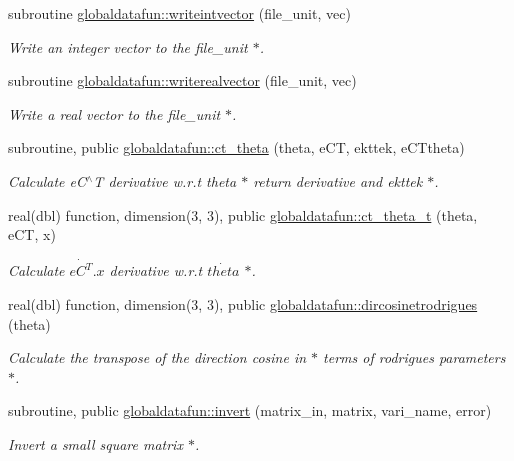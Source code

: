 \begin{DoxyCompactItemize}
subroutine \hyperlink{namespaceglobaldatafun_a08c5dd4cdc68f1694d0d44f76c4df0d5}{globaldatafun\+::writeintvector} (file\+\_\+unit, vec)
\begin{DoxyCompactList}\small\item\em Write an integer vector to the file\+\_\+unit $\ast$. \end{DoxyCompactList}\item 
subroutine \hyperlink{namespaceglobaldatafun_a6a36231350f9af76a3a20cd590f6e40a}{globaldatafun\+::writerealvector} (file\+\_\+unit, vec)
\begin{DoxyCompactList}\small\item\em Write a real vector to the file\+\_\+unit $\ast$. \end{DoxyCompactList}\item 
subroutine, public \hyperlink{namespaceglobaldatafun_a166b3774feeda05d1e3d1761c1412e85}{globaldatafun\+::ct\+\_\+theta} (theta, e\+CT, ekttek, e\+C\+Ttheta)
\begin{DoxyCompactList}\small\item\em Calculate e\+C$^\wedge$T derivative w.\+r.\+t theta $\ast$ return derivative and ekttek $\ast$. \end{DoxyCompactList}\item 
real(dbl) function, dimension(3, 3), public \hyperlink{namespaceglobaldatafun_a88e61f954347d95bbbbeb6b4aa6f2e8f}{globaldatafun\+::ct\+\_\+theta\+\_\+t} (theta, e\+CT, x)
\begin{DoxyCompactList}\small\item\em Calculate $ \dot{eC^T}.x $ derivative w.\+r.\+t $ \dot{theta} $ $\ast$. \end{DoxyCompactList}\item 
real(dbl) function, dimension(3, 3), public \hyperlink{namespaceglobaldatafun_a79e0439ba9c19e8c9bd28d76417cc4db}{globaldatafun\+::dircosinetrodrigues} (theta)
\begin{DoxyCompactList}\small\item\em Calculate the transpose of the direction cosine in $\ast$ terms of rodrigues parameters $\ast$. \end{DoxyCompactList}\item 
subroutine, public \hyperlink{namespaceglobaldatafun_a1e393f2df119550fc86d1c0864fde446}{globaldatafun\+::invert} (matrix\+\_\+in, matrix, vari\+\_\+name, error)
\begin{DoxyCompactList}\small\item\em Invert a small square matrix $\ast$. \end{DoxyCompactList}\item 

\end{DoxyCompactItemize}
